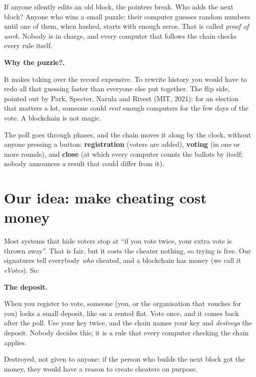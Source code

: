 \documentclass[11pt,a4paper]{article}
\newenvironment{aside}[1][Aside]{%
  \def\FrameCommand{\fboxsep=8pt\fcolorbox{boxrule}{boxbg}}%
  \MakeFramed{\advance\hsize-2\fboxsep\FrameRestore}%
  \noindent\textbf{#1.}\par\smallskip%
}{\endMakeFramed}
\begin{document}
If anyone silently edits an old block, the pointers break. Who adds the
next block? Anyone who wins a small puzzle: their computer guesses random
numbers until one of them, when hashed, starts with enough zeros. That is
called \emph{proof of work}. Nobody is in charge, and every computer that
follows the chain checks every rule itself.

\begin{aside}[Why the puzzle?]
It makes taking over the record expensive. To rewrite history you would
have to redo all that guessing faster than everyone else put together.
The flip side, pointed out by Park, Specter, Narula and Rivest (MIT, 2021):
for an election that matters a lot, someone could \emph{rent} enough
computers for the few days of the vote. A blockchain is not magic.
\end{aside}

The poll goes through phases, and the chain moves it along by the clock,
without anyone pressing a button: \textbf{registration} (voters are
added), \textbf{voting} (in one or more rounds), and \textbf{close} (at
which every computer counts the ballots by itself; nobody announces a
result that could differ from it).

\section{Our idea: make cheating cost money}

Most systems that hide voters stop at ``if you vote twice, your extra vote
is thrown away''. That is fair, but it costs the cheater nothing, so trying
is free. Our signatures tell everybody \emph{who} cheated, and a blockchain
has money (we call it \emph{eVotes}). So:

\begin{aside}[The deposit]
When you register to vote, someone (you, or the organisation that vouches
for you) locks a small deposit, like on a rented flat. Vote once, and it
comes back after the poll. Use your key twice, and the chain names your key
and \emph{destroys} the deposit. Nobody decides this; it is a rule that
every computer checking the chain applies.
\end{aside}

Destroyed, not given to anyone: if the person who builds the next block got
the money, they would have a reason to create cheaters on purpose.
\end{document}
